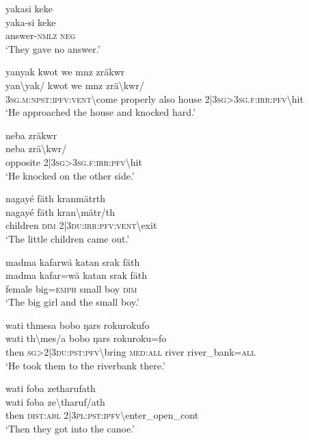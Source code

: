 \ea\label{ex:9:a2265}
yakasi keke\\
\gll yaka-si	keke\\
     answer-\textsc{nmlz}	\textsc{neg}\\
\glt `They gave no answer.'
\z

\ea\label{ex:9:a2266}
yanyak kwot we mnz zräkwr\\
\gll yan{\textbackslash}yak/	kwot	we	mnz	zrä{\textbackslash}kwr/\\
     3\textsc{sg}.\textsc{m}:\textsc{npst}:\textsc{ipfv}:\textsc{vent}{\textbackslash}come	properly	also	house	2|3\textsc{sg}>3\textsc{sg}.\textsc{f}:\textsc{irr}:\textsc{pfv}{\textbackslash}hit\\
\glt `He approached the house and knocked hard.'
\z

\ea\label{ex:9:a2267}
neba zräkwr\\
\gll neba	zrä{\textbackslash}kwr/\\
     opposite	2|3\textsc{sg}>3\textsc{sg}.\textsc{f}:\textsc{irr}:\textsc{pfv}{\textbackslash}hit\\
\glt `He knocked on the other side.'
\z

\ea\label{ex:9:a2268}
nagayé fäth kranmätrth\\
\gll nagayé	fäth	kran{\textbackslash}mätr/th\\
     children	\textsc{dim}	2|3\textsc{du}:\textsc{irr}:\textsc{pfv}:\textsc{vent}{\textbackslash}exit\\
\glt `The little children came out.'
\z

\ea\label{ex:9:a2269}
madma kafarwä katan srak fäth\\
\gll madma	kafar=wä	katan	srak	fäth\\
     female	big=\textsc{emph}	small	boy	\textsc{dim}\\
\glt `The big girl and the small boy.'
\z

\ea\label{ex:9:a2272}
wati thmesa bobo ŋars rokurokufo\\
\gll wati	th{\textbackslash}mes/a	bobo	ŋars	rokuroku=fo\\
     then	\textsc{sg}>2|3\textsc{du}:\textsc{pst}:\textsc{pfv}{\textbackslash}bring	\textsc{med}:\textsc{all}	river	river\_bank=\textsc{all}\\
\glt `He took them to the riverbank there.'
\z

\ea\label{ex:9:a2274}
wati foba zetharufath\\
\gll wati	foba	ze{\textbackslash}tharuf/ath\\
     then	\textsc{dist}:\textsc{abl}	2|3\textsc{pl}:\textsc{pst}:\textsc{ipfv}{\textbackslash}enter\_open\_cont\\
\glt `Then they got into the canoe.'
\z

